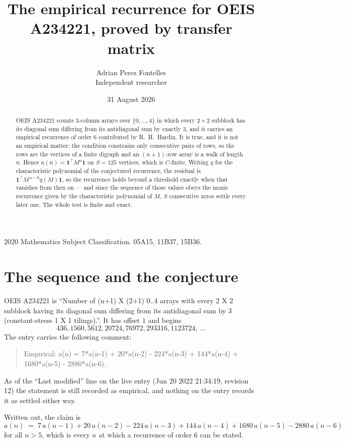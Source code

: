 \documentclass[11pt,a4paper]{article}
\title{The empirical recurrence for OEIS A234221, proved by transfer matrix}
\author{Adrian Perez Fontelles\\ \small Independent researcher}
\date{31 August 2026}
\theoremstyle{plain}
\theoremstyle{definition}
\begin{document}
\maketitle

\begin{abstract}
OEIS A234221 counts $3$-column arrays over $\{0,\dots,4\}$ in which every
$2\times2$ subblock has its diagonal sum differing from its antidiagonal sum by
exactly $3$, and it
carries an empirical recurrence of order $6$ contributed by R.~H.~Hardin. It is true,
and it is not an empirical matter: the condition constrains only consecutive pairs of rows,
so the rows are the vertices of a finite digraph and an $(n+1)$-row array is a walk of
length $n$. Hence $a(n)=\mathbf{1}^{\!\top}M^{n}\mathbf{1}$ on $S=125$ vertices, which
is $C$-finite. Writing $q$ for the characteristic polynomial of the conjectured recurrence,
the residual is $\mathbf{1}^{\!\top}M^{\,n-6}q(M)\mathbf{1}$, so the recurrence
holds beyond a threshold exactly when that vanishes from then on --- and since the sequence
of those values obeys the monic recurrence given by the characteristic polynomial of $M$,
$S$ consecutive zeros settle every later one. The whole test is finite and exact.
\end{abstract}

\noindent\small 2020 Mathematics Subject Classification. 05A15, 11B37, 15B36.\normalsize

\section{The sequence and the conjecture}

OEIS A234221 is ``Number of (n+1) X (2+1) 0..4 arrays with every 2 X 2 subblock having its diagonal sum differing from its antidiagonal sum by 3 (constant-stress 1 X 1 tilings).''. It has offset
$1$ and begins
\[
436, 1560, 5612, 20724, 76972, 293316, 1123724,\ \dots
\]
The entry carries the following comment:
\begin{quote}\small
Empirical: a(n) = 7*a(n-1) + 20*a(n-2) - 224*a(n-3) + 144*a(n-4) + 1680*a(n-5) - 2880*a(n-6).
\end{quote}
As of the ``Last modified'' line on the live entry (Jun 20 2022 21:34:19, revision 12) the statement is
still recorded as empirical, and nothing on the entry records it as settled either way.

Written out, the claim is
\begin{equation}\label{eq:conj}
a(n)\;=\;7\,a(n-1) + 20\,a(n-2) - 224\,a(n-3) + 144\,a(n-4) + 1680\,a(n-5) - 2880\,a(n-6)
\end{equation}
for all $n>5$, which is every $n$ at which a recurrence of order $6$ can be
stated.
\end{document}
